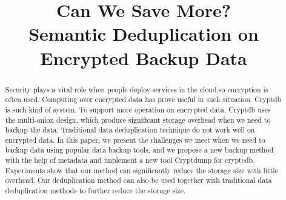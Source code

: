 \documentclass[10pt,sigconf]{acmart}
\begin{document}
\title{Can We Save More? \\ Semantic Deduplication on Encrypted Backup Data}






\begin{abstract}


Security plays a vital role when people deploy services in the cloud,so encryption is often used. Computing over encrypted data has prove useful in such situation. Cryptdb\citep{popa2011cryptdb} is such kind of system. To support more operation on encrypted data, Cryptdb uses the multi-onion design, which produce significant storage overhead when we need to backup the data. Traditional data deduplication technique do not work well on encrypted data. In this paper, we present the challenges we meet when we need to backup data using popular data backup tools, and we propose a new backup method with the help of metadata and implement a new tool Cryptdump for cryptedb. Experiments show that our method can  significantly reduce the storage size with little overhead. Our deduplication method can also be used together with traditional data deduplication methods to further reduce the storage size.









\end{abstract}
\end{document}
